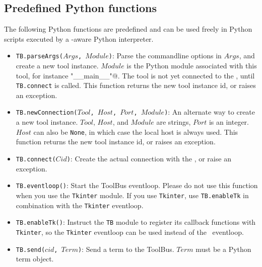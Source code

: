 \subsection{\label{Python-functions}Predefined Python functions}
The following Python functions are predefined and can be used freely in Python
scripts executed by a \TB -aware Python interpreter.

\begin{itemize}

\item {\tt TB.parseArgs($Args$, $Module$)}:  Parse the commandline
      options in $Args$, and create a new tool instance. $Module$ is
      the Python module associated with this tool, for instance
      \verb@ "__main__"@. The tool is not yet connected to the \TB, until
      {\tt TB.connect} is called. This function returns the new tool
      instance id, or raises an exception.

\item {\tt TB.newConnection($Tool$, $Host$, $Port$, $Module$)}: An alternate
      way to create a new tool instance. $Tool$, $Host$, and $Module$ are
      strings, $Port$ is an integer. $Host$ can also be {\tt None}, in which
      case the local host is always used. This function returns the new
      tool instance id, or raises an exception.

\item {\tt TB.connect($Cid$)}: Create the actual connection with the \TB,
      or raise an exception.

\item {\tt TB.eventloop()}: Start the ToolBus eventloop. Please do not use
      this function when you use the {\tt Tkinter} module. If you use
      {\tt Tkinter}, use {\tt TB.enableTk} in combination with the
      {\tt Tkinter} eventloop.

\item {\tt TB.enableTk()}: Instruct the {\tt TB} module to register
      its callback functions with {\tt Tkinter}, so the {\tt Tkinter}
      eventloop can be used instead of the \TB\ eventloop.

\item {\tt TB.send($cid$, $Term$)}: Send a term to the ToolBus. $Term$ must
      be a Python term object.


\end{itemize}
